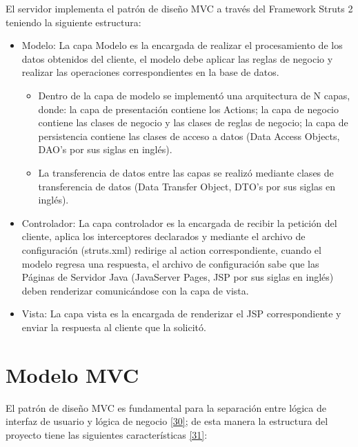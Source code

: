 El servidor implementa el patrón de diseño MVC a través del Framework Struts 2 teniendo la siguiente estructura:
\begin{itemize}
	\item Modelo: La capa Modelo es la encargada de realizar el procesamiento de los datos obtenidos del cliente, el modelo debe aplicar las reglas de negocio y realizar las operaciones correspondientes en la base de datos.
	
	\begin{itemize}
	
	\item Dentro de la capa de modelo se implementó una arquitectura de N capas, donde: la capa de presentación contiene los Actions; la capa de negocio contiene las clases de negocio y las clases de reglas de negocio; la capa de persistencia contiene las clases de acceso a datos (Data Access Objects, DAO’s por sus siglas en inglés).\\
	
	\item La transferencia de datos entre las capas se realizó mediante clases de transferencia de datos (Data Transfer Object,  DTO’s por sus siglas en inglés).
	
	\end{itemize}
	
	\item Controlador: La capa controlador es la encargada de recibir la petición del cliente, aplica los interceptores declarados y mediante el archivo de configuración (struts.xml) redirige al action correspondiente, cuando el modelo regresa una respuesta, el archivo de configuración sabe que las Páginas de Servidor Java (JavaServer Pages, JSP por sus siglas en inglés) deben renderizar comunicándose con la capa de vista.
	
	\item Vista: La capa vista es la encargada de renderizar el JSP correspondiente y enviar la respuesta al cliente que la solicitó.
\end{itemize}


\section{Modelo MVC}
El patrón de diseño MVC es fundamental para la separación entre lógica de interfaz de usuario y lógica de negocio \hyperlink{b30}{[30]}; de esta manera la estructura del proyecto tiene las siguientes características \hyperlink{b31}{[31]}:

